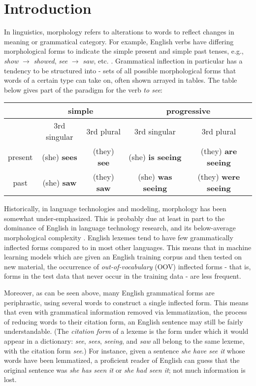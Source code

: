\chapter{Introduction}
\label{introduction}

In linguistics, morphology refers to alterations to words to reflect changes in meaning or grammatical category. For example, English verbs have differing morphological forms to indicate the simple present and simple past tenses, e.g., \textit{show} $\rightarrow$ \textit{showed}, \textit{see} $\rightarrow$ \textit{saw}, etc. \parencite{Dreyer2008}. Grammatical inflection in particular has a tendency to be structured into  - sets of all possible morphological forms that words of a certain type can take on, often shown arrayed in tables. The table below gives part of the paradigm for the verb \textit{to see}:

\begin{tabular}{|c||c|c|c|c|}
\hline
& \multicolumn{2}{c|}{simple} & \multicolumn{2}{c|}{progressive} \\
\hline
& 3rd singular & 3rd plural & 3rd singular & 3rd plural \\
\hline \hline
present & (she) \textbf{sees} & (they) \textbf{see} & (she) \textbf{is seeing} & (they) \textbf{are seeing} \\
\hline 
past & (she) \textbf{saw} & (they) \textbf{saw} & (she) \textbf{was seeing} & (they) \textbf{were seeing} \\
\hline
\end{tabular}

Historically, in language technologies and modeling, morphology has been somewhat under-emphasized. This is probably due at least in part to the dominance of English in language technology research, and its below-average morphological complexity \parencite{Cotterell2017}. English lexemes tend to have few grammatically inflected forms compared to in most other languages. This means that in machine learning models which are given an English training corpus and then tested on new material, the occurrence of \textit{out-of-vocabulary} (OOV) inflected forms - that is, forms in the test data that never occur in the training data - are less frequent. 

Moreover, as can be seen above, many English grammatical forms are periphrastic, using several words to construct a single inflected form. This means that even with grammatical information removed via lemmatization, the process of reducing words to their citation form, an English sentence may still be fairly understandable. (The \textit{citation form} of a lexeme is the form under which it would appear in a dictionary: \textit{see}, \textit{sees}, \textit{seeing}, and \textit{saw} all belong to the same lexeme, with the citation form \textit{see}.) For instance, given a sentence \textit{she have see it} whose words have been lemmatized, a proficient reader of English can guess that the original sentence was \textit{she has seen it} or \textit{she had seen it}; not much information is lost.

